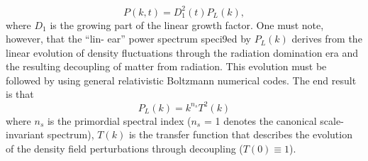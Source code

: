 \begin{description}
	\begin{equation*}
	P(k,t) = D_1^2(t) P_L(k),
	\end{equation*}
	where $D_1$ is the growing part of the linear growth factor. One must note, however, that the “lin-
	ear” power spectrum speci9ed by $P_L(k)$ derives from the linear evolution of density fluctuations
	through the radiation domination era and the resulting decoupling of matter from radiation. This evolution must be followed by using general relativistic Boltzmann numerical codes. The end
	result is that
	\[P_L(k)=k^{n_s} T^2 (k)\]
	where $n_s$ is the primordial spectral index ($n_s$ = 1 denotes the canonical scale-invariant spectrum), $T(k)$ is the transfer function that describes the evolution of the density field perturbations through decoupling ($T (0) ≡ 1$).
	
	
	

\end{description}
